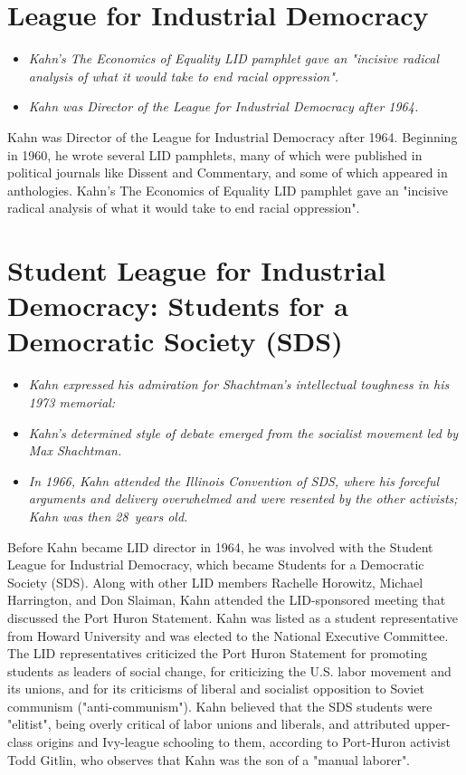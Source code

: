 \section{League for Industrial
Democracy}\label{league-for-industrial-democracy}

\begin{itemize}
\item
  \emph{Kahn's The Economics of Equality LID pamphlet gave an "incisive
  radical analysis of what it would take to end racial oppression".}
\item
  \emph{Kahn was Director of the League for Industrial Democracy after
  1964.}
\end{itemize}

Kahn was Director of the League for Industrial Democracy after 1964.
Beginning in 1960, he wrote several LID pamphlets, many of which were
published in political journals like Dissent and Commentary, and some of
which appeared in anthologies. Kahn's The Economics of Equality LID
pamphlet gave an "incisive radical analysis of what it would take to end
racial oppression".

\section{Student League for Industrial Democracy: Students for a
Democratic Society
(SDS)}\label{student-league-for-industrial-democracy-students-for-a-democratic-society-sds}

\begin{itemize}
\item
  \emph{Kahn expressed his admiration for Shachtman's intellectual
  toughness in his 1973 memorial:}
\item
  \emph{Kahn's determined style of debate emerged from the socialist
  movement led by Max Shachtman.}
\item
  \emph{In 1966, Kahn attended the Illinois Convention of SDS, where his
  forceful arguments and delivery overwhelmed and were resented by the
  other activists; Kahn was then 28~years old.}
\end{itemize}

Before Kahn became LID director in 1964, he was involved with the
Student League for Industrial Democracy, which became Students for a
Democratic Society (SDS). Along with other LID members Rachelle
Horowitz, Michael Harrington, and Don Slaiman, Kahn attended the
LID-sponsored meeting that discussed the Port Huron Statement. Kahn was
listed as a student representative from Howard University and was
elected to the National Executive Committee. The LID representatives
criticized the Port Huron Statement for promoting students as leaders of
social change, for criticizing the U.S. labor movement and its unions,
and for its criticisms of liberal and socialist opposition to Soviet
communism ("anti-communism"). Kahn believed that the SDS students were
"elitist", being overly critical of labor unions and liberals, and
attributed upper-class origins and Ivy-league schooling to them,
according to Port-Huron activist Todd Gitlin, who observes that Kahn was
the son of a "manual laborer".

